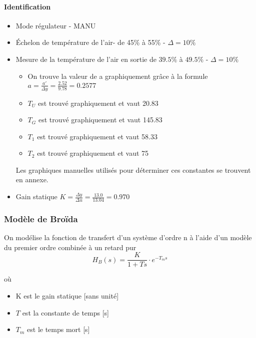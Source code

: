 \paragraph{Identification}
\begin{itemize}
\item Mode régulateur - MANU
\item Échelon de température de l'air- de 45\% à 55\% - $\Delta = 10\%$
\item Mesure de la température de l'air en sortie de $39.5\%$ à $49.5\%$ - $\Delta = 10\%$


\begin{itemize}
\item On trouve la valeur de a graphiquement grâce à la formule $a = \frac{a'}{\Delta y} = \frac{2.52}{9.78} = 0.2577$

\item $T_{U}$ est trouvé graphiquement et vaut 20.83 

\item $T_{G}$ est trouvé graphiquement et vaut 145.83

\item $T_{1}$ est trouvé graphiquement et vaut 58.33

\item $T_{2}$ est trouvé graphiquement et vaut 75
\end{itemize}

Les graphiques manuelles utilisés pour déterminer ces constantes se trouvent en annexe. 

\item Gain statique $K = \frac{\Delta y}{\Delta u} = \frac{13.0}{13.04} = 0.970 $
\end{itemize}

\subsubsection{Modèle de Broïda}
On modélise la fonction de transfert d'un système d'ordre n à l'aide d'un modèle du premier ordre combinée à un retard pur
\begin{equation}
H_{B}(s) = \frac{K}{1 + Ts} \cdot e^{-T_{m}s}
\end{equation}

où 
\begin{itemize}
\item K est le gain statique [sans unité]
\item $T$ est la constante de temps [s]
\item $T_{m}$ est le temps mort [s]
\end{itemize}

